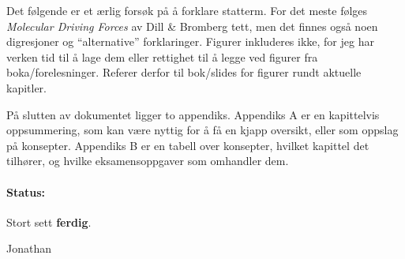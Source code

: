 
\noindent Det følgende er et ærlig forsøk på å forklare statterm. For det meste følges \emph{Molecular Driving Forces} av Dill \& Bromberg tett, men det finnes også noen digresjoner og ``alternative'' forklaringer. Figurer inkluderes ikke, for jeg har verken tid til å lage dem eller rettighet til å legge ved figurer fra boka/forelesninger. Referer derfor til bok/slides for figurer rundt aktuelle kapitler. 

 På slutten av dokumentet ligger to appendiks. Appendiks A er en kapittelvis oppsummering, som kan være nyttig for å få en kjapp oversikt, eller som oppslag på konsepter. Appendiks B er en tabell over konsepter, hvilket kapittel det tilhører, og hvilke eksamensoppgaver som omhandler dem.

\paragraph{\color{Black} Status:} Stort sett {\color{Green}\bf ferdig}.
\begin{flushright}Jonathan\end{flushright}
